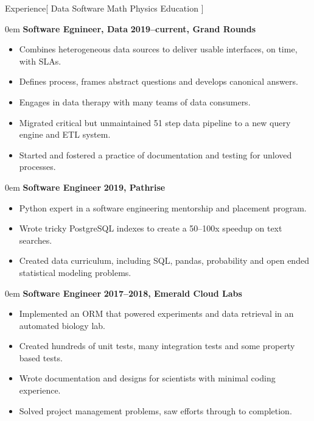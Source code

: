 \documentclass[11pt,a4paper]{article}
\newenvironment{headedsection}[2]{
    \begin{addmargin}[0.5em]{0em}
    {\large\bfseries #1} \hfill {\bfseries #2}%
    \begin{itemize}
        [label={}, topsep=0pt, itemsep=1.5pt, parsep=0pt, leftmargin=1.5em]
}{
    \end{itemize}
    \end{addmargin}
    \medskip
}
\begin{document}
\sloppy  %


\vspace{1em}

\begin{mysection}{Experience}[
    Data
    \textbullet{} Software
    \textbullet{} Math
    \textbullet{} Physics
    \textbullet{} Education
]

  \begin{headedsection}
        {Software Egnineer, Data}
        {2019--current, Grand Rounds}

    \item Combines heterogeneous data sources to deliver usable interfaces,
          on time, with SLAs.
    \item Defines process, frames abstract questions and develops canonical
          answers.
    \item Engages in data therapy with many teams of data consumers.
    \item Migrated critical but unmaintained 51 step data pipeline to a new
          query engine and ETL system.
    \item Started and fostered a practice of documentation and testing for
          unloved processes.

  \end{headedsection}

  \begin{headedsection}
        {Software Engineer}
        {2019, Pathrise}

    \item Python expert in a software engineering mentorship and placement
          program.
    \item Wrote tricky PostgreSQL indexes to create a 50--100x speedup on text
          searches.
    \item Created data curriculum, including SQL, pandas, probability and open
          ended statistical modeling problems.

  \end{headedsection}

  \begin{headedsection}
        {Software Engineer}
        {2017--2018, Emerald Cloud Labs}

    \item Implemented an ORM that powered experiments and data retrieval in an
          automated biology lab.
    \item Created hundreds of unit tests, many integration tests and some
          property based tests.
    \item Wrote documentation and designs for scientists with minimal coding
          experience.
    \item Solved project management problems, saw efforts through to completion.


\end{headedsection}
\end{mysection}
\end{document}

